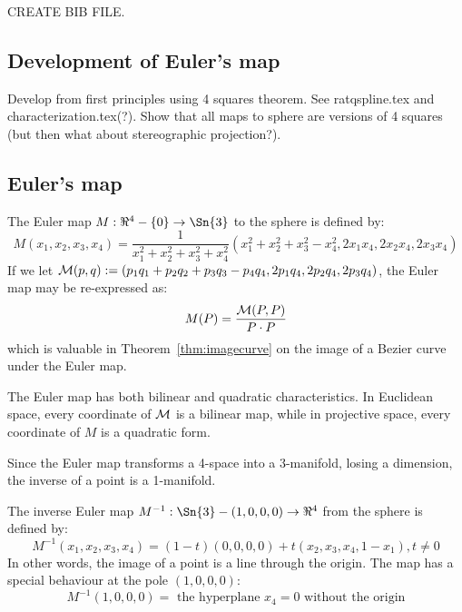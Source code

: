 \documentclass[12pt]{article}
\begin{document}
CREATE BIB FILE.

\clearpage

\subsection{Development of Euler's map}

Develop from first principles using 4 squares theorem.
See ratqspline.tex and characterization.tex(?).
Show that all maps to sphere are versions of 4 squares (but then what about stereographic
projection?).

\clearpage

\subsection{Euler's map}

\begin{defn2}
The Euler map $M: \Re^4 - \{0\} \rightarrow \Sn{3}$ to the sphere is defined by:
\begin{equation}
\label{eqM}
	M(x_1,x_2,x_3,x_4) =
	\frac{1}{x_1^2 + x_2^2 + x_3^2 + x_4^2}
	(x_1^2 + x_2^2 + x_3^2 - x_4^2, 2x_1x_4, 2x_2x_4, 2x_3x_4)
\end{equation}
%
If we let 
${\cal M}(p,q): = (p_1q_1 + p_2q_2 + p_3q_3 - p_4q_4, 2p_1q_4, 2p_2q_4, 2p_3q_4)$,
the Euler map may be re-expressed as:
\begin{equation}
\label{eq:calM}
M(P) = \frac{{\cal M}(P,P)}{P \cdot P}
\end{equation}
which is valuable in Theorem~\ref{thm:imagecurve} on the image of a Bezier curve
under the Euler map.
\end{defn2}

The Euler map has both bilinear and quadratic characteristics.
In Euclidean space, every coordinate of ${\cal M}$ is a bilinear map,
while in projective space, every coordinate of $M$ is a quadratic form.

Since the Euler map transforms a 4-space into a 3-manifold, losing a dimension,
the inverse of a point is a 1-manifold.

\begin{lemma}
\label{lem:inverse}
The inverse Euler map $M^{-1}: \Sn{3} - (1,0,0,0) \rightarrow \Re^4$ from the sphere
is defined by:
\begin{equation}
M^{-1}(x_1,x_2,x_3,x_4) = (1-t)(0,0,0,0) + t(x_2,x_3,x_4,1-x_1), t \neq 0
\end{equation}
In other words, the image of a point is a line through the origin.
The map has a special behaviour at the pole $(1,0,0,0)$:
\begin{equation}
M^{-1}(1,0,0,0) = \mbox{ the hyperplane $x_4=0$ without the origin}
\end{equation}
\end{lemma}
\prf
\QED
\end{document}
